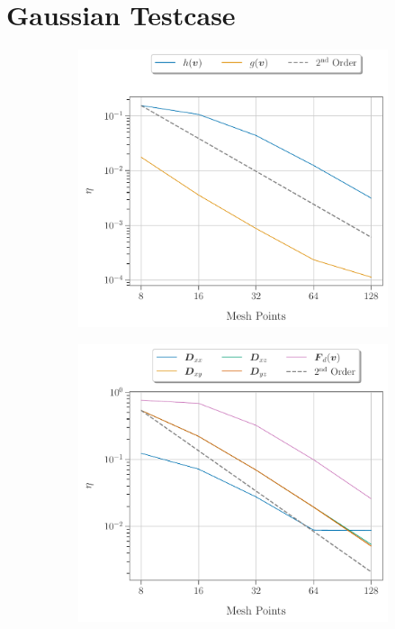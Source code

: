 \section{Gaussian Testcase}

\begin{figure}[h]
  \begin{subfigure}[b]{0.50\textwidth}
    \includegraphics[width=\textwidth]{figures/appendix/convergenceStudy/hg_005vmax_HOCKNEY.pdf}
    \caption{}
    \label{fig:convergence_hg_HOCKNEY}
  \end{subfigure}
  \hfill
  \begin{subfigure}[b]{0.50\textwidth}
    \includegraphics[width=\textwidth]{figures/appendix/convergenceStudy/D+Fd_005vmax_HOCKNEY.pdf}

\end{subfigure}
\end{figure}
